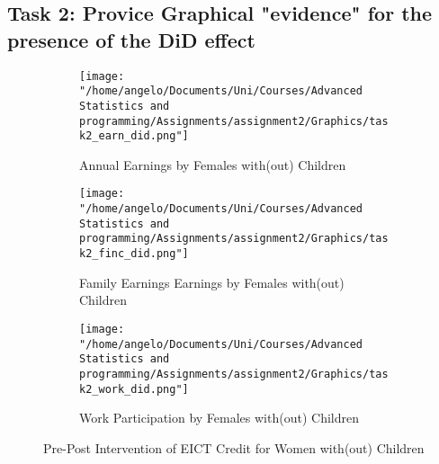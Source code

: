 \documentclass[a4paper]{article}
\begin{document}
\subsection{Task 2: Provice Graphical "evidence" for the presence of the DiD effect}

\begin{wrapfigure}{L}{9cm}
\centering
\begin{subfigure}[b]{0.5\textwidth}
    \texttt{[image: "/home/angelo/Documents/Uni/Courses/Advanced Statistics and programming/Assignments/assignment2/Graphics/task2\_earn\_did.png"]} 
   \caption{Annual Earnings by Females with(out) Children}
   \label{fig:Ng2}
\end{subfigure}

\begin{subfigure}[b]{0.5\textwidth}
    \texttt{[image: "/home/angelo/Documents/Uni/Courses/Advanced Statistics and programming/Assignments/assignment2/Graphics/task2\_finc\_did.png"]} 
   \caption{Family Earnings Earnings by Females with(out) Children}
   \label{fig:Ng2}
\end{subfigure}

\begin{subfigure}[b]{0.5\textwidth}
    \texttt{[image: "/home/angelo/Documents/Uni/Courses/Advanced Statistics and programming/Assignments/assignment2/Graphics/task2\_work\_did.png"]}  
   \caption{Work Participation by Females with(out) Children}
   \label{fig:Ng2}
\end{subfigure}
\captionsetup{justification=centering}
\caption{Pre-Post Intervention of EICT Credit for Women with(out) Children}
\end{wrapfigure}
\end{document}
